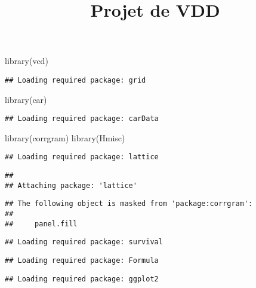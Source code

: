 \documentclass[
]{article}
\title{Projet de VDD}
\author{}
\date{\vspace{-2.5em}}
\newenvironment{Shaded}{\begin{snugshade}}{\end{snugshade}}
\newcommand{\FunctionTok}[1]{\textcolor[rgb]{0.00,0.00,0.00}{#1}}
\newcommand{\NormalTok}[1]{#1}
\begin{document}
\maketitle

\begin{Shaded}
\begin{Highlighting}[]
\FunctionTok{library}\NormalTok{(vcd)}
\end{Highlighting}
\end{Shaded}

\begin{verbatim}
## Loading required package: grid
\end{verbatim}

\begin{Shaded}
\begin{Highlighting}[]
\FunctionTok{library}\NormalTok{(car)}
\end{Highlighting}
\end{Shaded}

\begin{verbatim}
## Loading required package: carData
\end{verbatim}

\begin{Shaded}
\begin{Highlighting}[]
\FunctionTok{library}\NormalTok{(corrgram)}
\FunctionTok{library}\NormalTok{(Hmisc)}
\end{Highlighting}
\end{Shaded}

\begin{verbatim}
## Loading required package: lattice
\end{verbatim}

\begin{verbatim}
## 
## Attaching package: 'lattice'
\end{verbatim}

\begin{verbatim}
## The following object is masked from 'package:corrgram':
## 
##     panel.fill
\end{verbatim}

\begin{verbatim}
## Loading required package: survival
\end{verbatim}

\begin{verbatim}
## Loading required package: Formula
\end{verbatim}

\begin{verbatim}
## Loading required package: ggplot2
\end{verbatim}
\end{document}
